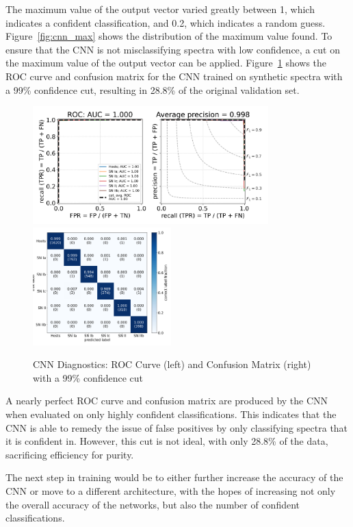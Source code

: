 The maximum value of the output vector varied greatly between 1, which indicates a 
confident classification, and 0.2, which indicates a random guess. Figure~\ref{fig:cnn_max} shows
the distribution of the maximum value found. To ensure that the CNN is not
misclassifying spectra with low confidence, a cut on the maximum value of the
output vector can be applied. Figure~\ref{fig:cnn_qual2} shows the ROC curve and confusion matrix
for the CNN trained on synthetic spectra with a 99\% confidence cut, resulting in 
28.8\% of the original validation set. 
\begin{figure}[t]
    \centering
    \includegraphics[height=4.55cm]{figures/cnn/cnn_roc99.png}
    \quad
    \includegraphics[height=4.55cm]{figures/cnn/cnn_cm99.png}
    \caption[CNN diagnostics with a confidence cut]{CNN Diagnostics: ROC Curve (left) and Confusion Matrix (right) with a 99\% confidence cut\label{fig:cnn_qual2}}
\end{figure}

A nearly perfect ROC curve and confusion matrix are produced by the CNN when
evaluated on only highly confident classifications. This indicates that the CNN
is able to remedy the issue of false positives by only classifying spectra that
it is confident in. However, this cut is not ideal, with only 28.8\% of the
data, sacrificing efficiency for purity.


The next step in training would be to either further increase the accuracy of the CNN 
or move to a different architecture, with the hopes of increasing not only 
the overall accuracy of the networks, but also the number of confident classifications.

